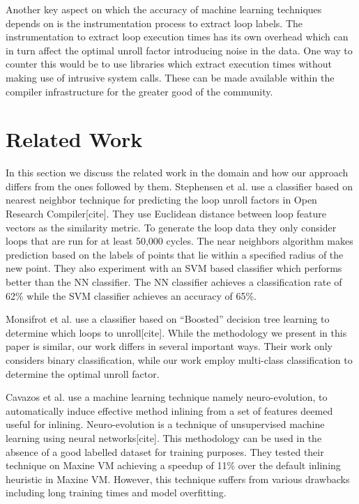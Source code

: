 \documentclass[]{sig-alternate}
\begin{document}
Another key aspect on which the accuracy of machine learning techniques depends on is the instrumentation process to extract loop labels. The instrumentation to extract loop execution times has its own overhead which can in turn affect the optimal unroll factor introducing noise in the data. One way to counter this would be to use libraries which extract execution times without making use of intrusive system calls. These can be made available within the compiler infrastructure for the greater good of the community.

\section{Related Work}
\label{sec:RelatedWork}
In this section we discuss the related work in the domain and how our approach differs from the ones followed by them.
Stephensen et al. use a classifier based on nearest neighbor technique for predicting the loop unroll factors in Open Research Compiler[cite]. They use Euclidean distance between loop feature vectors as the similarity metric. To generate the loop data they only consider loops that are run for at least 50,000 cycles. The near neighbors algorithm makes prediction based on the labels of points that lie within a specified radius of the new point. They also experiment with an SVM based classifier which performs better than the NN classifier. The NN classifier achieves a classification rate of 62\% while the SVM classifier achieves an accuracy of 65\%.

Monsifrot et al. use a classifier based on ``Boosted'' decision tree learning to determine which loops to unroll[cite]. While the methodology we present in this paper is similar, our work differs in several important ways. Their work only considers binary classification, while our work employ multi-class classification to determine the optimal unroll factor.

Cavazos et  al. use a machine learning technique namely neuro-evolution, to automatically induce effective method inlining from a set of features deemed useful for inlining. Neuro-evolution is a technique of unsupervised machine learning using neural networks[cite]. This methodology can be used in the absence of a good labelled dataset for training purposes. They tested their technique on Maxine VM achieving a speedup of 11\% over the default inlining heuristic in Maxine VM. However, this technique suffers from various drawbacks including long training times and model overfitting.
\end{document}

